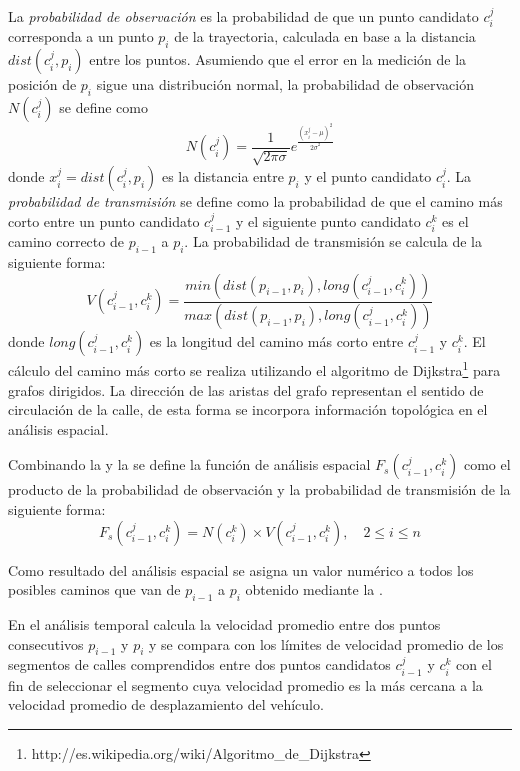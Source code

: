 La \emph{probabilidad de observación} es la probabilidad de que un punto candidato $c_{i}^{j}$ corresponda a un punto $p_i$ de la trayectoria, calculada en base a la distancia $dist(c_{i}^{j},p_i)$ entre los puntos. Asumiendo que el error en la medición de la posición de $p_i$ sigue una distribución normal, la probabilidad de observación $N(c_{i}^{j})$ se define como
\begin{equation} \label{probabilidad_de_observacion}
N(c_{i}^{j}) = \frac {1}{\sqrt { 2 \pi \sigma }} {e}^{\frac {{(x_{i}^{j} - \mu)}^{2}}{{ 2 \sigma}^{2}}}
\end{equation}
donde $x_{i}^{j} = dist(c_{i}^{j},p_i)$ es la distancia entre $p_i$ y el punto candidato $c_{i}^{j}$. 
La \emph{probabilidad de transmisión} se define como la probabilidad de que el camino más corto entre un punto candidato $c_{i-1}^{j}$ y el siguiente punto candidato $c_{i}^{k}$ es el camino correcto de $p_{i-1}$ a $p_i$. La probabilidad de transmisión se calcula de la siguiente forma: 
\begin{equation} \label{probabilidad_de_transmision}
V(c_{i-1}^{j}, c_{i}^{k}) = \frac { min( dist(p_{i-1}, p_i), long(c_{i-1}^{j}, c_{i}^{k})) }{ max (dist(p_{i-1}, p_i), long(c_{i-1}^{j}, c_{i}^{k})) }
\end{equation}
donde $long(c_{i-1}^{j}, c_{i}^{k})$ es la longitud del camino más corto entre $c_{i-1}^{j}$ y $c_{i}^{k}$. El cálculo del camino más corto se realiza utilizando el algoritmo de Dijkstra\footnote{http://es.wikipedia.org/wiki/Algoritmo\_de\_Dijkstra} para grafos dirigidos. La dirección de las aristas del grafo representan el sentido de circulación de la calle, de esta forma se incorpora información topológica en el análisis espacial.

Combinando la  y la  se define la función de análisis espacial $F_s(c_{i-1}^{j},c_{i}^{k})$ como el producto de la probabilidad de observación y la probabilidad de transmisión de la siguiente forma:
\begin{equation} \label{funcion_espacial}
F_s(c_{i-1}^{j},c_{i}^{k}) = N(c_{i}^{k}) \times V(c_{i-1}^{j}, c_{i}^{k}), \quad 2 \le i \le n 
\end{equation}

Como resultado del análisis espacial se asigna un valor numérico a todos los posibles caminos que van de $p_{i-1}$ a $p_i$ obtenido mediante la .

En el análisis temporal calcula la velocidad promedio entre dos puntos consecutivos $p_{i-1}$ y $p_i$ y se compara con los límites de velocidad promedio de los segmentos de calles comprendidos entre dos puntos candidatos $c_{i-1}^{j}$ y $c_{i}^{k}$ con el fin de seleccionar el segmento cuya velocidad promedio es la más cercana a la velocidad promedio de desplazamiento del vehículo.

